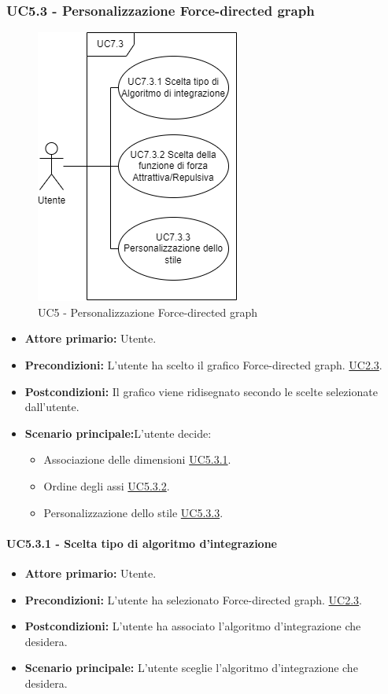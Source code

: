 \subsubsection{UC5.3 - Personalizzazione Force-directed graph}
\label{sec:UC5.3}
\begin{figure}[h!]
	\centering
	\includegraphics[scale=0.55]{../../assets/personalizzazioneForce-directedGraph.drawio.png}
	\caption{UC5 - Personalizzazione Force-directed graph}
\end{figure}
\begin{itemize}
    \item \textbf{Attore primario:} Utente.
	\item \textbf{Precondizioni:} L'utente ha scelto il grafico Force-directed graph. \hyperref[sec:UC2.3]{UC2.3}.
	\item \textbf{Postcondizioni:} Il grafico viene ridisegnato secondo le scelte selezionate dall'utente.
	\item \textbf{Scenario principale:}L'utente decide:
	\begin{itemize}
        \item Associazione delle dimensioni \hyperref[sec:UC5.3.1]{UC5.3.1}.
        \item Ordine degli assi \hyperref[sec:UC5.3.2]{UC5.3.2}.
        \item Personalizzazione dello stile \hyperref[sec:UC5.3.3]{UC5.3.3}.
    \end{itemize}
\end{itemize}
\paragraph{UC5.3.1 - Scelta tipo di algoritmo d'integrazione}
\label{sec:UC5.3.1}
    \begin{itemize}
        \item \textbf{Attore primario:} Utente.
        \item \textbf{Precondizioni:} L'utente ha selezionato Force-directed graph. \hyperref[sec:UC2.3]{UC2.3}.
	    \item \textbf{Postcondizioni:} L'utente ha associato l'algoritmo d'integrazione che desidera.
	    \item \textbf{Scenario principale:} L'utente sceglie l'algoritmo d'integrazione che desidera.
    \end{itemize}
